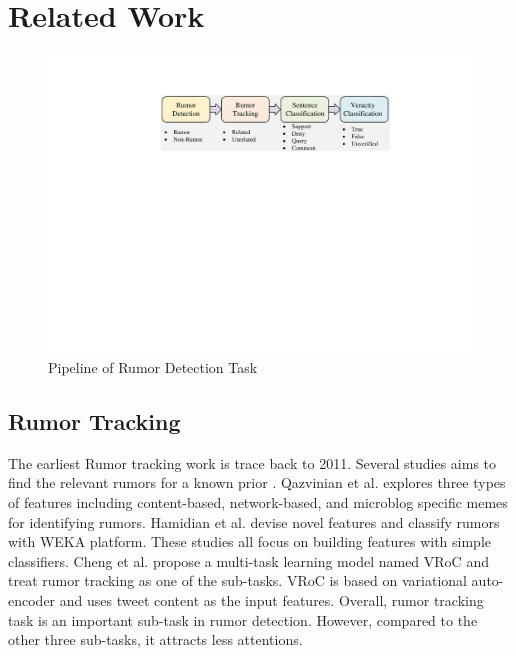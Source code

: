 \section{Related Work}
\label{sec:related}

\begin{figure}[tbp]
	\hspace{0ex}
	\vspace{0ex}
	\centering
	\includegraphics[width = \textwidth]{fig/pipeline}
	\caption{Pipeline of Rumor Detection Task}
	\label{fig:pipeline}
\end{figure}


\subsection{Rumor Tracking}
\label{sec:rumortracking}
The earliest Rumor tracking work is trace back to 2011. Several studies aims to find the relevant rumors for a known prior \cite{DBLP:journals/csur/ZubiagaABLP18}. Qazvinian et al. \cite{DBLP:conf/emnlp/QazvinianRRM11} explores three types of features including content-based, network-based, and microblog specific memes for identifying rumors. Hamidian et al. \cite{DBLP:journals/corr/abs-1912-08926} devise novel features and classify rumors with WEKA platform. These studies all focus on building features with simple classifiers. Cheng et al. \cite{DBLP:conf/www/ChengNB20} propose a multi-task learning model named VRoC and treat rumor tracking as one of the sub-tasks. VRoC is based on variational auto-encoder and uses tweet content as the input features. Overall, rumor tracking task is an important sub-task in rumor detection. However, compared to the other three sub-tasks, it attracts less attentions.

